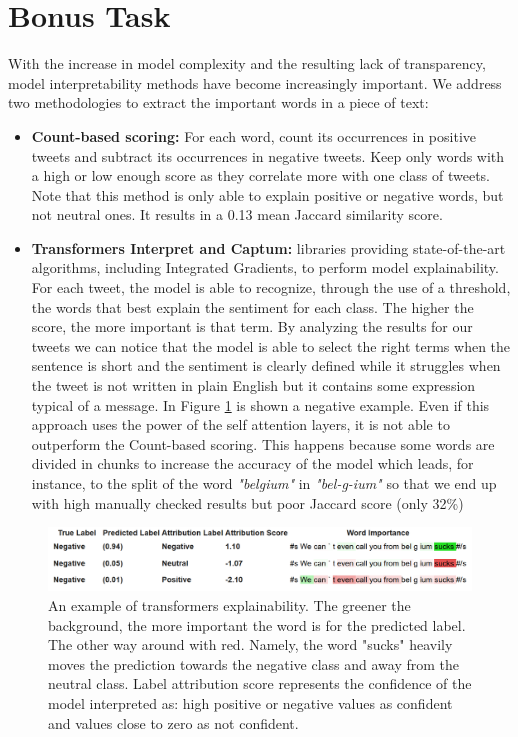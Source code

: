 \documentclass{article}
\begin{document}
\section{Bonus Task}
With the increase in model complexity and the resulting lack of transparency, model interpretability methods have become increasingly important. We address two methodologies to extract the important words in a piece of text:
\begin{itemize}
		\item \textbf{Count-based scoring:} For each word, count its occurrences in  positive tweets and subtract its occurrences in negative tweets. Keep only words with a high or low enough score as they correlate more with one class of tweets. Note that this method is only able to explain positive or negative words, but not neutral ones. It results in a 0.13 mean Jaccard similarity score.
		
		\item \textbf{Transformers Interpret and Captum:} libraries providing state-of-the-art algorithms, including Integrated Gradients, to perform model explainability. For each tweet, the model is able to recognize, through the use of a threshold, the words that best explain the sentiment for each class. The higher the score, the more important is that term. 
        By analyzing the results for our tweets we can notice that the model is able to select the right terms when the sentence is short and the sentiment is clearly defined while it struggles when the tweet is not written in plain English but it contains some expression typical of a message. In Figure \ref{fig:Explainability Score} is shown a negative example. Even if this approach uses the power of the self attention layers, it is not able to outperform the Count-based scoring. This happens because some words are divided in chunks to increase the accuracy of the model which leads, for instance, to the split of the word \textit{"belgium"} in \textit{"bel-g-ium"} so that we end up with high manually checked results but poor Jaccard score (only 32\%) 
\end{itemize}

  \begin{figure}[h]
        \hspace{.45cm}
        \includegraphics[width=\linewidth]{assets/visualizations.png}
        \caption{An example of transformers explainability. The greener the background, the more important the word is for the predicted label. The other way around with red. Namely, the word "sucks" heavily moves the prediction towards the negative class and away from the neutral class. Label attribution score represents the confidence of the model interpreted as: high positive or negative values as confident and values close to zero as not confident.   }
        \label{fig:Explainability Score}
    \end{figure}
\end{document}
